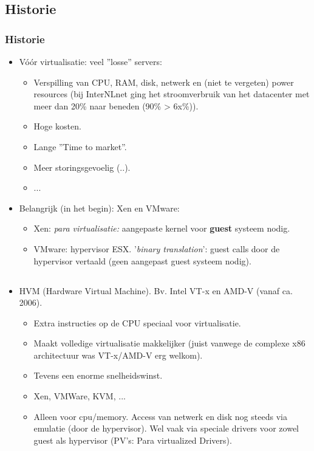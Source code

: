 \subsection{Historie}
\begin{styleframe}
    \frametitle{Historie}
\begin{itemize}
	\item V\'o\'or virtualisatie: veel ''losse'' servers:
	\pause
	\begin{itemize}
		\item Verspilling van CPU, RAM, disk, netwerk en (niet te vergeten) power resources (bij InterNLnet ging het stroomverbruik van het datacenter met meer dan 20\% naar beneden (90\% \-> 6x\%)).
		\pause
		\item Hoge kosten.
		\pause
		\item Lange ''Time to market''.
		\pause
		\item Meer storingsgevoelig (..).
		\pause
		\item ...
		\pause
	\end{itemize}
	\item Belangrijk (in het begin): Xen en VMware:
	\pause
	\begin{itemize}
		\item Xen: {\it para virtualisatie:} aangepaste kernel voor {\bf guest} systeem nodig.
		\pause
		\item VMware: hypervisor ESX. '{\it binary translation}': guest calls door de hypervisor vertaald (geen aangepast guest systeem nodig).
	\end{itemize}
\end{itemize}
\end{styleframe}

\subsection {}
\begin{styleframe}
    \frametitle{}
\begin{itemize}
	\item HVM (Hardware Virtual Machine). Bv. Intel VT-x en AMD-V (vanaf ca. 2006).
	\pause
	\begin{itemize}
		\item Extra instructies op de CPU speciaal voor virtualisatie.
		\pause
		\item Maakt volledige virtualisatie makkelijker (juist vanwege de complexe x86 architectuur was VT-x/AMD-V erg welkom).
		\pause
		\item Tevens een enorme snelheidswinst.
		\pause
		\item Xen, VMWare, KVM, ...
		\pause
		\item Alleen voor cpu/memory. Access van netwerk en disk nog steeds via emulatie (door de hypervisor). Wel vaak via speciale drivers voor zowel guest als hypervisor (PV's: Para virtualized Drivers).
	\end{itemize}
\end{itemize}
\end{styleframe}

